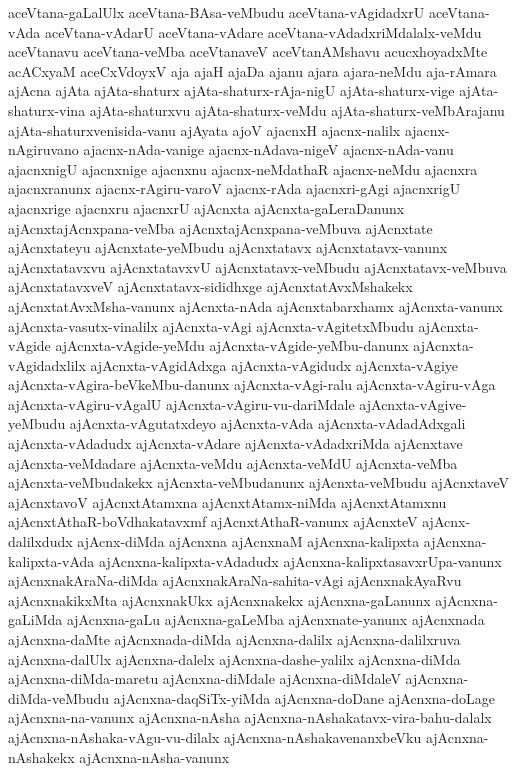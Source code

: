 {aceVtana-gaLalUlx
aceVtana-BAsa-veMbudu
aceVtana-vAgidadxrU
aceVtana-vAda
aceVtana-vAdarU
aceVtana-vAdare
aceVtana-vAdadxriMdalalx-veMdu
aceVtanavu
aceVtana-veMba
aceVtanaveV
aceVtanAMshavu
acucxhoyadxMte
acACxyaM
aceCxVdoyxV
aja
ajaH
ajaDa
ajanu
ajara
ajara-neMdu
aja-rAmara
ajAcna
ajAta
ajAta-shaturx
ajAta-shaturx-rAja-nigU
ajAta-shaturx-vige
ajAta-shaturx-vina
ajAta-shaturxvu
ajAta-shaturx-veMdu
ajAta-shaturx-veMbArajanu
ajAta-shaturxvenisida-vanu
ajAyata
ajoV
ajacnxH
ajacnx-nalilx
ajacnx-nAgiruvano
ajacnx-nAda-vanige
ajacnx-nAdava-nigeV
ajacnx-nAda-vanu
ajacnxnigU
ajacnxnige
ajacnxnu
ajacnx-neMdathaR
ajacnx-neMdu
ajacnxra
ajacnxranunx
ajacnx-rAgiru-varoV
ajacnx-rAda
ajacnxri-gAgi
ajacnxrigU
ajacnxrige
ajacnxru
ajacnxrU
ajAcnxta
ajAcnxta-gaLeraDanunx
ajAcnxtajAcnxpana-veMba
ajAcnxtajAcnxpana-veMbuva
ajAcnxtate
ajAcnxtateyu
ajAcnxtate-yeMbudu
ajAcnxtatavx
ajAcnxtatavx-vanunx
ajAcnxtatavxvu
ajAcnxtatavxvU
ajAcnxtatavx-veMbudu
ajAcnxtatavx-veMbuva
ajAcnxtatavxveV
ajAcnxtatavx-sididhxge
ajAcnxtatAvxMshakekx
ajAcnxtatAvxMsha-vanunx
ajAcnxta-nAda
ajAcnxtabarxhamx
ajAcnxta-vanunx
ajAcnxta-vasutx-vinalilx
ajAcnxta-vAgi
ajAcnxta-vAgitetxMbudu
ajAcnxta-vAgide
ajAcnxta-vAgide-yeMdu
ajAcnxta-vAgide-yeMbu-danunx
ajAcnxta-vAgidadxlilx
ajAcnxta-vAgidAdxga
ajAcnxta-vAgidudx
ajAcnxta-vAgiye
ajAcnxta-vAgira-beVkeMbu-danunx
ajAcnxta-vAgi-ralu
ajAcnxta-vAgiru-vAga
ajAcnxta-vAgiru-vAgalU
ajAcnxta-vAgiru-vu-dariMdale
ajAcnxta-vAgive-yeMbudu
ajAcnxta-vAgutatxdeyo
ajAcnxta-vAda
ajAcnxta-vAdadAdxgali
ajAcnxta-vAdadudx
ajAcnxta-vAdare
ajAcnxta-vAdadxriMda
ajAcnxtave
ajAcnxta-veMdadare
ajAcnxta-veMdu
ajAcnxta-veMdU
ajAcnxta-veMba
ajAcnxta-veMbudakekx
ajAcnxta-veMbudanunx
ajAcnxta-veMbudu
ajAcnxtaveV
ajAcnxtavoV
ajAcnxtAtamxna
ajAcnxtAtamx-niMda
ajAcnxtAtamxnu
ajAcnxtAthaR-boVdhakatavxmf
ajAcnxtAthaR-vanunx
ajAcnxteV
ajAcnx-dalilxdudx
ajAcnx-diMda
ajAcnxna
ajAcnxnaM
ajAcnxna-kalipxta
ajAcnxna-kalipxta-vAda
ajAcnxna-kalipxta-vAdadudx
ajAcnxna-kalipxtasavxrUpa-vanunx
ajAcnxnakAraNa-diMda
ajAcnxnakAraNa-sahita-vAgi
ajAcnxnakAyaRvu
ajAcnxnakikxMta
ajAcnxnakUkx
ajAcnxnakekx
ajAcnxna-gaLanunx
ajAcnxna-gaLiMda
ajAcnxna-gaLu
ajAcnxna-gaLeMba
ajAcnxnate-yanunx
ajAcnxnada
ajAcnxna-daMte
ajAcnxnada-diMda
ajAcnxna-dalilx
ajAcnxna-dalilxruva
ajAcnxna-dalUlx
ajAcnxna-dalelx
ajAcnxna-dashe-yalilx
ajAcnxna-diMda
ajAcnxna-diMda-maretu
ajAcnxna-diMdale
ajAcnxna-diMdaleV
ajAcnxna-diMda-veMbudu
ajAcnxna-daqSiTx-yiMda
ajAcnxna-doDane
ajAcnxna-doLage
ajAcnxna-na-vanunx
ajAcnxna-nAsha
ajAcnxna-nAshakatavx-vira-bahu-dalalx
ajAcnxna-nAshaka-vAgu-vu-dilalx
ajAcnxna-nAshakavenanxbeVku
ajAcnxna-nAshakekx
ajAcnxna-nAsha-vanunx
}

